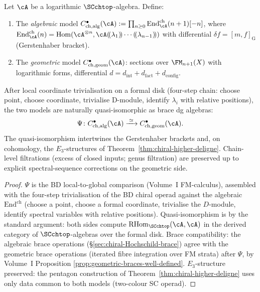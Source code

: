 \begin{proposition}%
\label{thm:chiral-hochschild-models-equivalent}%
%
%
%
Let $\cA$ be a logarithmic $\SCchtop$-algebra. Define:
\begin{enumerate}
 \item[\textup{(a)}] The \emph{algebraic} model
 $C^\bullet_{\mathrm{ch,alg}}(\cA)
 :=\prod_{n\ge 0}\mathrm{End}^{\mathrm{ch}}_\cA(n+1)[-n]$,
 where $\mathrm{End}^{\mathrm{ch}}_\cA(n)=
 \mathrm{Hom}(\cA^{\otimes n},\cA(\!(\lambda_1)\!)\cdots(\!(\lambda_{n-1})\!))$
 with differential $\delta f=[m,f]_{\mathrm{G}}$ (Gerstenhaber bracket).
 \item[\textup{(b)}] The \emph{geometric} model
 $C^\bullet_{\mathrm{ch,geom}}(\cA)$: sections over $\FM_{n+1}(X)$
 with logarithmic forms, differential $d=d_{\mathrm{int}}+d_{\mathrm{fact}}+d_{\mathrm{config}}$.
\end{enumerate}
After local coordinate trivialisation on a formal disk (four-step
chain: choose point, choose coordinate, trivialise D-module,
identify $\lambda_i$ with relative positions), the two models are
naturally quasi-isomorphic as brace dg algebras:
\[
\Psi\colon C^\bullet_{\mathrm{ch,alg}}(\cA)
\xrightarrow{\;\simeq\;} C^\bullet_{\mathrm{ch,geom}}(\cA).
\]
The quasi-isomorphism intertwines the Gerstenhaber brackets
and, on cohomology, the $E_3$-structures of
Theorem~\ref{thm:chiral-higher-deligne}.
Chain-level filtrations (excess of closed inputs; genus filtration)
are preserved up to explicit spectral-sequence corrections
on the geometric side.
\end{proposition}

\begin{proof}
$\Psi$ is the BD local-to-global comparison (Volume~I
FM-calculus), assembled with the four-step trivialisation of the
BD chiral operad against the algebraic $\mathrm{End}^{\mathrm{ch}}$
(choose a point, choose a formal coordinate, trivialise the
$D$-module, identify spectral variables with relative positions).
Quasi-isomorphism is by the standard argument: both sides compute
$\mathrm{RHom}_{\SCchtop}(\cA,\cA)$ in the derived category of
$\SCchtop$-algebras over the formal disk.
Brace compatibility: the algebraic brace operations
(\S\ref{sec:chiral-Hochschild-brace}) agree with the geometric brace
operations (iterated fibre integration over FM strata) after
$\Psi$, by Volume~I Proposition
\ref*{prop:geometric-braces-well-defined}.
$E_3$-structure preserved: the pentagon construction of
Theorem~\ref{thm:chiral-higher-deligne} uses only data common to both
models (two-colour SC operad).
\end{proof}

